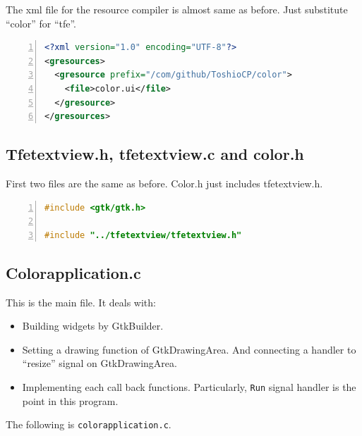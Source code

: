 The xml file for the resource compiler is almost same as before. Just
substitute ``color'' for ``tfe''.

\begin{lstlisting}[language=XML, numbers=left]
<?xml version="1.0" encoding="UTF-8"?>
<gresources>
  <gresource prefix="/com/github/ToshioCP/color">
    <file>color.ui</file>
  </gresource>
</gresources>
\end{lstlisting}

\hypertarget{tfetextview.h-tfetextview.c-and-color.h}{%
\subsection{Tfetextview.h, tfetextview.c and
color.h}\label{tfetextview.h-tfetextview.c-and-color.h}}

First two files are the same as before. Color.h just includes
tfetextview.h.

\begin{lstlisting}[language=C, numbers=left]
#include <gtk/gtk.h>

#include "../tfetextview/tfetextview.h"
\end{lstlisting}

\hypertarget{colorapplication.c}{%
\subsection{Colorapplication.c}\label{colorapplication.c}}

This is the main file. It deals with:

\begin{itemize}
\tightlist
\item
  Building widgets by GtkBuilder.
\item
  Setting a drawing function of GtkDrawingArea. And connecting a handler
  to ``resize'' signal on GtkDrawingArea.
\item
  Implementing each call back functions. Particularly,
  \passthrough{\lstinline!Run!} signal handler is the point in this
  program.
\end{itemize}

The following is \passthrough{\lstinline!colorapplication.c!}.

